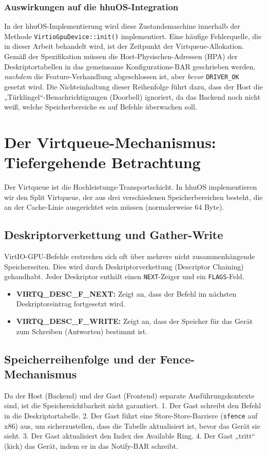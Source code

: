 \subsubsection{Auswirkungen auf die hhuOS-Integration}
In der hhuOS-Implementierung wird diese Zustandsmaschine innerhalb der Methode \texttt{VirtioGpuDevice::init()} implementiert. Eine häufige Fehlerquelle, die in dieser Arbeit behandelt wird, ist der Zeitpunkt der Virtqueue-Allokation. Gemäß der Spezifikation müssen die Host-Physischen-Adressen (HPA) der Deskriptortabellen in das gemeinsame Konfigurations-BAR geschrieben werden, \textit{nachdem} die Feature-Verhandlung abgeschlossen ist, aber \textit{bevor} \texttt{DRIVER\_OK} gesetzt wird. Die Nichteinhaltung dieser Reihenfolge führt dazu, dass der Host die „Türklingel“-Benachrichtigungen (Doorbell) ignoriert, da das Backend noch nicht weiß, welche Speicherbereiche es auf Befehle überwachen soll.

\section{Der Virtqueue-Mechanismus: Tiefergehende Betrachtung}
Der Virtqueue ist die Hochleistungs-Transportschicht. In hhuOS implementieren wir den Split Virtqueue, der aus drei verschiedenen Speicherbereichen besteht, die an der Cache-Linie ausgerichtet sein müssen (normalerweise 64 Byte).

\subsection{Deskriptorverkettung und Gather-Write}
VirtIO-GPU-Befehle erstrecken sich oft über mehrere nicht zusammenhängende Speicherseiten. Dies wird durch Deskriptorverkettung (Descriptor Chaining) gehandhabt. Jeder Deskriptor enthält einen \texttt{NEXT}-Zeiger und ein \texttt{FLAGS}-Feld.
\begin{itemize}
    \item \textbf{VIRTQ\_DESC\_F\_NEXT:} Zeigt an, dass der Befehl im nächsten Deskriptoreintrag fortgesetzt wird.
    \item \textbf{VIRTQ\_DESC\_F\_WRITE:} Zeigt an, dass der Speicher für das Gerät zum Schreiben (Antworten) bestimmt ist.
\end{itemize}

\subsection{Speicherreihenfolge und der Fence-Mechanismus}
Da der Host (Backend) und der Gast (Frontend) separate Ausführungskontexte sind, ist die Speichersichtbarkeit nicht garantiert.
1. Der Gast schreibt den Befehl in die Deskriptortabelle.
2. Der Gast führt eine Store-Store-Barriere (\texttt{sfence} auf x86) aus, um sicherzustellen, dass die Tabelle aktualisiert ist, bevor das Gerät sie sieht.
3. Der Gast aktualisiert den Index des Available Ring.
4. Der Gast „tritt“ (kick) das Gerät, indem er in das Notify-BAR schreibt.

